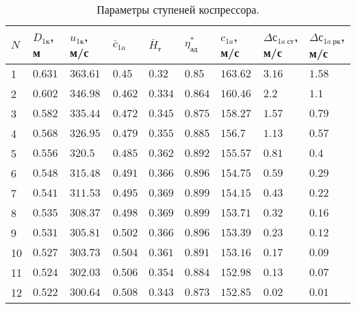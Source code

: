 \documentclass[a4paper,10pt]{article}
\begin{document}
    \begin{longtable}{|p{0.6cm}|p{1.2cm}|p{1.2cm}|p{1.2cm}|p{1.2cm}|p{1.2cm}|p{1.2cm}|p{1.2cm}|p{1.3cm}|}
        \caption{Параметры ступеней коспрессора.}\\ \hline
        $N$ & $D_{1к}$, м & $u_{1к}$, м/с & $\bar{c}_{1a}$ & $\bar{H}_т$ & $\eta_{ад}^*$ &
        $c_{1a}$, м/с & $\Delta с_{1a\ ст}$, м/с & $\Delta с_{1a\ рк}$, м/с \\ \hline
%        
        1 & $0.631$ & $363.61$ &
        $0.45$ &
        $0.32$ & $0.85$ &
        $163.62$ & $3.16$ &
        $1.58$ \\ \hline
%        
        2 & $0.602$ & $346.98$ &
        $0.462$ &
        $0.334$ & $0.864$ &
        $160.46$ & $2.2$ &
        $1.1$ \\ \hline
%        
        3 & $0.582$ & $335.44$ &
        $0.472$ &
        $0.345$ & $0.875$ &
        $158.27$ & $1.57$ &
        $0.79$ \\ \hline
%        
        4 & $0.568$ & $326.95$ &
        $0.479$ &
        $0.355$ & $0.885$ &
        $156.7$ & $1.13$ &
        $0.57$ \\ \hline
%        
        5 & $0.556$ & $320.5$ &
        $0.485$ &
        $0.362$ & $0.892$ &
        $155.57$ & $0.81$ &
        $0.4$ \\ \hline
%        
        6 & $0.548$ & $315.48$ &
        $0.491$ &
        $0.366$ & $0.896$ &
        $154.75$ & $0.59$ &
        $0.29$ \\ \hline
%        
        7 & $0.541$ & $311.53$ &
        $0.495$ &
        $0.369$ & $0.899$ &
        $154.15$ & $0.43$ &
        $0.22$ \\ \hline
%        
        8 & $0.535$ & $308.37$ &
        $0.498$ &
        $0.369$ & $0.899$ &
        $153.71$ & $0.32$ &
        $0.16$ \\ \hline
%        
        9 & $0.531$ & $305.81$ &
        $0.502$ &
        $0.366$ & $0.896$ &
        $153.39$ & $0.23$ &
        $0.12$ \\ \hline
%        
        10 & $0.527$ & $303.73$ &
        $0.504$ &
        $0.361$ & $0.891$ &
        $153.16$ & $0.17$ &
        $0.09$ \\ \hline
%        
        11 & $0.524$ & $302.03$ &
        $0.506$ &
        $0.354$ & $0.884$ &
        $152.98$ & $0.13$ &
        $0.07$ \\ \hline
%        
        12 & $0.522$ & $300.64$ &
        $0.508$ &
        $0.343$ & $0.873$ &
        $152.85$ & $0.02$ &
        $0.01$ \\ \hline
%        
    \end{longtable}
\end{document}
